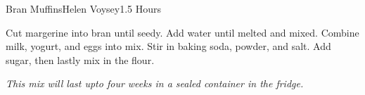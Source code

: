 \begin{recipe}{Bran Muffins}{Helen Voysey}{1.5 Hours}

  Cut margerine into bran until seedy. Add water until melted and
  mixed. Combine milk, yogurt, and eggs into mix. Stir in baking soda, powder,
  and salt. Add sugar, then lastly mix in the flour.
\end{recipe}

\textit{This mix will last upto four weeks in a sealed container in the
  fridge.}

